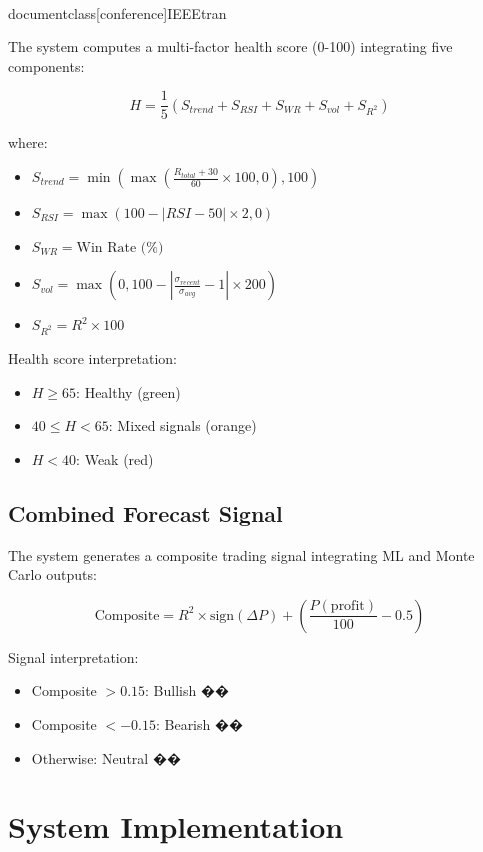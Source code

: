 \\documentclass[conference]{IEEEtran}
\begin{document}
The system computes a multi-factor health score (0-100) integrating five components:

\begin{equation}
    H = \frac{1}{5}(S_{trend} + S_{RSI} + S_{WR} + S_{vol} + S_{R^2})
\end{equation}

where:
\begin{itemize}
    \item $S_{trend} = \min(\max(\frac{R_{total} + 30}{60} \times 100, 0), 100)$
    \item $S_{RSI} = \max(100 - |RSI - 50| \times 2, 0)$
    \item $S_{WR} = \text{Win Rate (\%)}$
    \item $S_{vol} = \max(0, 100 - |\frac{\sigma_{recent}}{\sigma_{avg}} - 1| \times 200)$
    \item $S_{R^2} = R^2 \times 100$
\end{itemize}

Health score interpretation:
\begin{itemize}
    \item $H \geq 65$: Healthy (green)
    \item $40 \leq H < 65$: Mixed signals (orange)
    \item $H < 40$: Weak (red)
\end{itemize}

\subsection{Combined Forecast Signal}

The system generates a composite trading signal integrating ML and Monte Carlo outputs:

\begin{equation}
    \text{Composite} = R^2 \times \text{sign}(\Delta P) + \left(\frac{P(\text{profit})}{100} - 0.5\right)
\end{equation}

Signal interpretation:
\begin{itemize}
    \item Composite $> 0.15$: Bullish ��
    \item Composite $< -0.15$: Bearish ��
    \item Otherwise: Neutral ��
\end{itemize}

\section{System Implementation}
\end{document}
